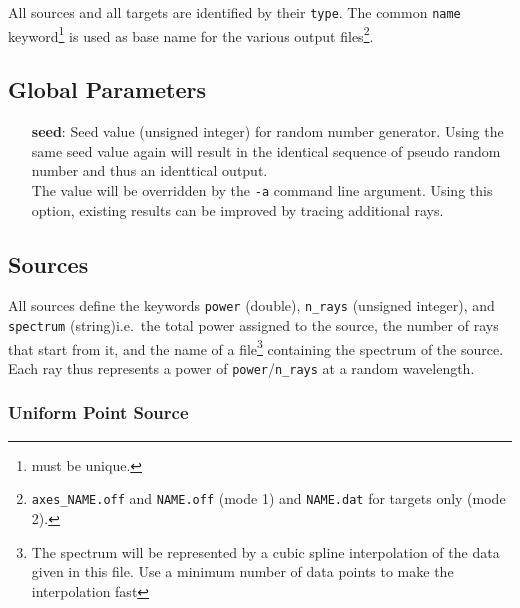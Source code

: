 \documentclass[10pt,a4paper,titlepage]{article}
\begin{document}
All sources and all targets are identified by their {\tt type}. The common {\tt name} keyword\footnote{must be unique.} is used as base name for the various output files\footnote{{\tt axes\_NAME.off} and {\tt NAME.off} (mode 1) and {\tt NAME.dat} for targets only (mode 2).}.

\subsection{Global Parameters}
\begin{itemize}
\item[{\bf seed}:]{Seed value (unsigned integer) for random number generator. Using the same seed value again will result in the identical sequence of pseudo random number and thus an identtical output.\\
The value will be overridden by the {\tt -a} command line argument. Using this option, existing results can be improved by tracing additional rays.}
\end{itemize}



\subsection{Sources}

All sources define the keywords {\tt power} (double), {\tt n\_rays} (unsigned integer), and {\tt spectrum} (string)i.e.~the total power assigned to the source, the number of rays that start from it, and the name of a file\footnote{The spectrum will be represented by a cubic spline interpolation of the data given in this file. Use a minimum number of data points to make the interpolation fast} containing the spectrum of the source. Each ray thus represents a power of {\tt power}/{\tt n\_rays} at a random wavelength.

\subsubsection{Uniform Point Source}






\end{document}
